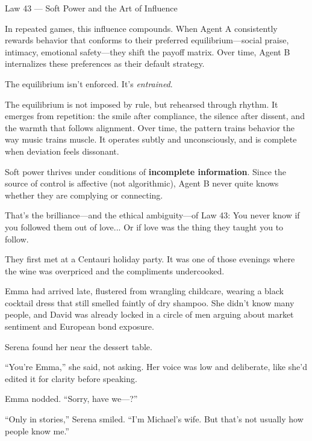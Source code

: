 \begin{PhilosophicalSidebar}{Law 43 --- Soft Power and the Art of Influence}
  \medskip
  
  In repeated games, this influence compounds. When Agent A consistently rewards behavior that conforms to 
  their preferred equilibrium—social praise, intimacy, emotional safety—they shift the payoff matrix. Over time, 
  Agent B internalizes these preferences as their default strategy.
  
  \medskip
  
  The equilibrium isn’t enforced. It’s \emph{entrained}. 
  
  \medskip

  The equilibrium is not imposed by rule, but rehearsed through rhythm.  
  It emerges from repetition: the smile after compliance, the silence after dissent, and the warmth that follows 
  alignment.  
  Over time, the pattern trains behavior the way music trains muscle. It operates subtly and unconsciously, 
  and is complete when deviation feels dissonant.
  
  \medskip
  
  Soft power thrives under conditions of \textbf{incomplete information}. Since the source of 
  control is affective (not algorithmic), Agent B never quite knows whether they are complying or connecting.
  
  \medskip
  
  That’s the brilliance—and the ethical ambiguity—of Law 43:
  You never know if you followed them out of love...
  Or if love was the thing they taught you to follow.
  
\end{PhilosophicalSidebar}

\medskip

They first met at a Centauri holiday party. It was one of those evenings where the wine was overpriced and 
the compliments undercooked.

Emma had arrived late, flustered from wrangling childcare, wearing a black cocktail dress that still 
smelled faintly of dry shampoo. She didn’t know many people, and David was already locked in a circle of 
men arguing about market sentiment and European bond exposure.

Serena found her near the dessert table.

``You’re Emma,'' she said, not asking. Her voice was low and deliberate, like she’d edited it for 
clarity before speaking.

Emma nodded. ``Sorry, have we—?''

``Only in stories,'' Serena smiled. ``I’m Michael’s wife. But that’s not usually how people know me.''

